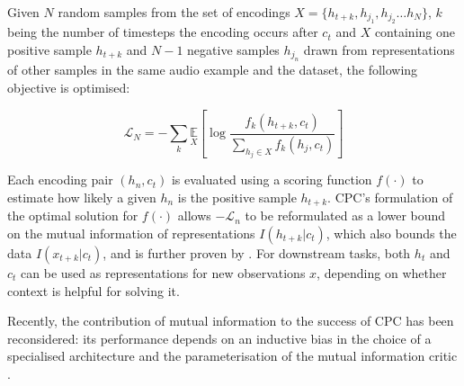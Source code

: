 Given $N$ random samples from the set of encodings $X = \{h_{t+k}, h_{j_1}, h_{j_2} \hdots h_N\}$, $k$ being the number of timesteps the encoding occurs after $c_t$ and $X$ containing one positive sample $h_{t+k}$ and $N-1$ negative samples $h_{j_{n}}$ drawn from representations of other samples in the same audio example and the dataset, the following objective is optimised:

\begin{equation}
    \mathcal{L}_{N}=-\sum_{k} \underset{X}{\mathbb{E}}\left[\log \frac{f_{k}\left(h_{t+k}, c_{t}\right)}{\sum_{h_{j} \in X} f_{k}\left(h_{j}, c_{t}\right)}\right]
\end{equation}

Each encoding pair $(h_n, c_t)$ is evaluated using a scoring function $f(\cdot)$ to estimate how likely a given $h_n$ is the positive sample $h_{t+k}$.
CPC's formulation of the optimal solution for $f(\cdot)$ allows $-\mathcal{L}_n$ to be reformulated as a lower bound on the mutual information of representations $I(h_{t+k} | c_t)$, which also bounds the data $I(x_{t+k} | c_t)$, and is further proven by \cite{poole_variational_2019}.
For downstream tasks, both $h_t$ and $c_t$ can be used as representations for new observations $x$, depending on whether context is helpful for solving it.

Recently, the contribution of mutual information to the success of CPC has been reconsidered: its performance depends on an inductive bias in the choice of a specialised architecture and the parameterisation of the mutual information critic \cite{Tschannen2020OnMI}.



